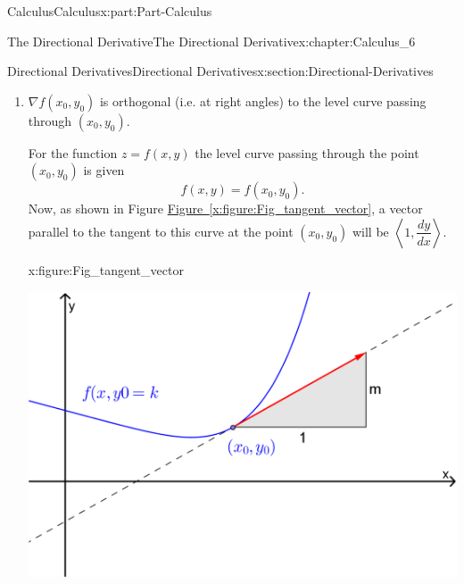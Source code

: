 \documentclass[oneside,10pt,]{book}
\newcommand{\xreffont}{\relax}
\numberwithin{equation}{section}
\newcommand{\bm}[1]{\boldsymbol{#1}}
\newcommand{\amp}{&}
\begin{document}
\begin{partptx}{Calculus}{}{Calculus}{}{}{x:part:Part-Calculus}
\begin{chapterptx}{The Directional Derivative}{}{The Directional Derivative}{}{}{x:chapter:Calculus_6}
\begin{sectionptx}{Directional Derivatives}{}{Directional Derivatives}{}{}{x:section:Directional-Derivatives}
\begin{enumerate}[label=\arabic*]
\begin{align*}
\amp = \| \nabla f \| \| \hat{\bm{u}} \| \cos(\theta)\\
\amp = \| \nabla f \| \cos(\theta)
\end{align*}
At a given point \(\| \nabla f \|\) is fixed and so the largest value of \(D_{\bm{u}} f(x,y)\) will occur when \(\cos(\theta) = 1\), i.e. when \(\theta = 0\) or put another way, when \(\hat{\bm{u}}\) is parallel to \(\nabla f\). We can also see from this that the largest value that the directional derivative can take is \(\| \nabla f \|\).%
\par
Similarly, the directional derivative takes on its smallest value in the direction of \(-\nabla f\) and has value \(- \| \nabla f \|\).%
\item{}\(\nabla f(x_0,y_0)\) is orthogonal (i.e. at right angles) to the level curve passing through \((x_0,y_0)\).%
\par
For the function \(z = f(x,y)\) the level curve passing through the point \((x_0,y_0)\) is given%
\begin{equation*}
f(x,y) = f(x_0,y_0)\text{.}
\end{equation*}
Now, as shown in Figure \hyperref[x:figure:Fig_tangent_vector]{Figure~{\xreffont\ref{x:figure:Fig_tangent_vector}}}, a vector parallel to the tangent to this curve at the point \((x_0,y_0)\) will be \(\left \langle 1, \dfrac{dy}{dx} \right \rangle\).%
\begin{figureptx}{}{x:figure:Fig_tangent_vector}{}%
\begin{image}{0.15}{0.7}{0.15}%
\includegraphics[width=\linewidth]{./Calculus/Images/6/Fig3_tangent_vector.png}
\end{image}%
\tcblower
\end{figureptx}%

\end{enumerate}
\end{sectionptx}
\end{chapterptx}
\end{partptx}
\end{document}
